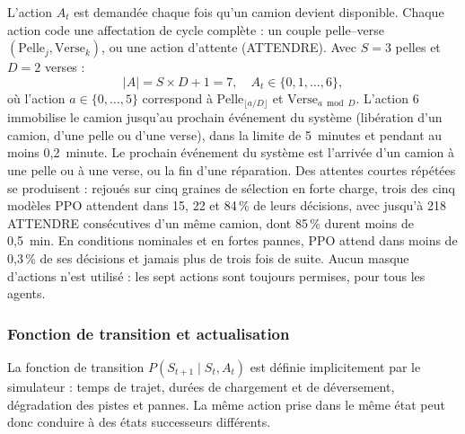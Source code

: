 \documentclass[11pt,a4paper]{article}
\newif\ifrevmarks
\newcommand{\revtag}[1]{\ifrevmarks\textsuperscript{\textcolor{red!70!black}{\scriptsize[#1]}}\fi}
\newcommand{\rev}[2]{\ifrevmarks{\color{revcolor}#2}\revtag{#1}\else#2\fi}
\newif\ifcorrmarks
\newcommand{\corr}[1]{\ifcorrmarks\textcolor{corrcolor}{#1}\else#1\fi}
\begin{document}
L'action $A_t$ est demandée chaque fois qu'un camion devient disponible. Chaque action code une affectation de cycle complète : un couple pelle--verse $(\text{Pelle}_j, \text{Verse}_k)$, ou une action d'attente (ATTENDRE). Avec $S=3$ pelles et $D=2$ verses :
\begin{equation}
  |A| = S \times D + 1 = 7,
  \quad A_t \in \{0, 1, \dots, 6\},
\end{equation}
où l'action $a \in \{0,\dots,5\}$ correspond à $\text{Pelle}_{\lfloor a/D \rfloor}$ et $\text{Verse}_{a \bmod D}$. \rev{M11}{L'action 6 immobilise le camion jusqu'au prochain événement du système (libération d'un camion, d'une pelle ou d'une verse), dans la limite de 5~minutes et pendant au moins 0,2~minute.} \corr{Le prochain événement du système est l'arrivée d'un camion à une pelle ou à une verse, ou la fin d'une réparation. Des attentes courtes répétées se produisent : rejoués sur cinq graines de sélection en forte charge, trois des cinq modèles PPO attendent dans 15, 22 et 84\,\% de leurs décisions, avec jusqu'à 218 ATTENDRE consécutives d'un même camion, dont 85\,\% durent moins de 0,5~min. En conditions nominales et en fortes pannes, PPO attend dans moins de 0,3\,\% de ses décisions et jamais plus de trois fois de suite.} \rev{M16, v3}{Aucun masque d'actions n'est utilisé : les sept actions sont toujours permises, pour tous les agents.}

\subsubsection{Fonction de transition et actualisation}
\label{sec:discount}

La fonction de transition $P(S_{t+1} \mid S_t, A_t)$ est définie implicitement par le simulateur : temps de trajet, durées de chargement et de déversement, dégradation des pistes et pannes. La même action prise dans le même état peut donc conduire à des états successeurs différents.
\end{document}
